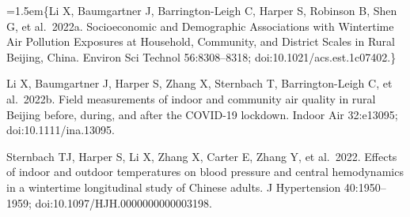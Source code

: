 \documentclass[
  letterpaper,
  DIV=11,
  numbers=noendperiod]{scrartcl}
\begin{document}
\hangindent=1.5em\{Li X, Baumgartner J, Barrington-Leigh C, Harper S,
Robinson B, Shen G, et al.~2022a. Socioeconomic and Demographic
Associations with Wintertime Air Pollution Exposures at Household,
Community, and District Scales in Rural Beijing, China. Environ Sci
Technol 56:8308--8318; doi:10.1021/acs.est.1c07402.\}

Li X, Baumgartner J, Harper S, Zhang X, Sternbach T, Barrington-Leigh C,
et al.~2022b. Field measurements of indoor and community air quality in
rural Beijing before, during, and after the COVID-19 lockdown. Indoor
Air 32:e13095; doi:10.1111/ina.13095.

Sternbach TJ, Harper S, Li X, Zhang X, Carter E, Zhang Y, et al.~2022.
Effects of indoor and outdoor temperatures on blood pressure and central
hemodynamics in a wintertime longitudinal study of Chinese adults. J
Hypertension 40:1950--1959; doi:10.1097/HJH.0000000000003198.
\end{document}
